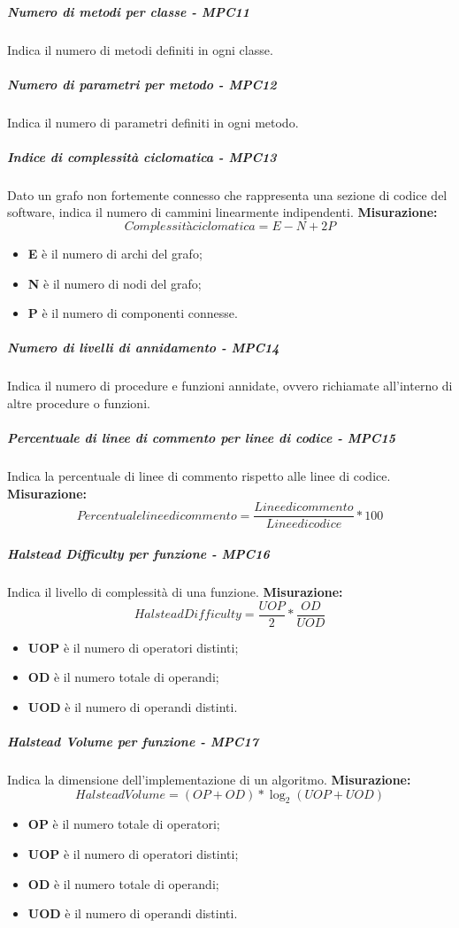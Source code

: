 \subparagraph{Numero di metodi per classe - MPC11}
Indica il numero di metodi definiti in ogni classe.
\subparagraph{Numero di parametri per metodo - MPC12}
Indica il numero di parametri definiti in ogni metodo.
\subparagraph{Indice di complessità ciclomatica - MPC13}
Dato un grafo non fortemente connesso che rappresenta una sezione di codice del software, indica il numero di cammini linearmente indipendenti.
\textbf{Misurazione:}\begin{equation}
Complessità ciclomatica = E - N + 2P
\end{equation}
\begin{itemize}
	\item \textbf{E} è il numero di archi del grafo;
	\item \textbf{N} è il numero di nodi del grafo;
	\item \textbf{P} è il numero di componenti connesse.
\end{itemize}
\subparagraph{Numero di livelli di annidamento - MPC14}
Indica il numero di procedure e funzioni annidate, ovvero richiamate all'interno di altre procedure o funzioni.
\subparagraph{Percentuale di linee di commento per linee di codice - MPC15}
Indica la percentuale di linee di commento rispetto alle linee di codice.
\textbf{Misurazione:}\begin{equation}
Percentuale linee di commento = \frac{Linee di commento}{Linee di codice} * 100
\end{equation}
\subparagraph{Halstead Difficulty per funzione - MPC16}
Indica il livello di complessità di una funzione.
\textbf{Misurazione:}\begin{equation}
Halstead Difficulty = \frac{UOP}{2} * \frac{OD}{UOD}
\end{equation}	
\begin{itemize}
	\item \textbf{UOP} è il numero di operatori distinti;
	\item \textbf{OD} è il numero totale di operandi;
	\item \textbf{UOD} è il numero di operandi distinti.
\end{itemize}
\subparagraph{Halstead Volume per funzione - MPC17}
Indica la dimensione dell'implementazione di un algoritmo.
\textbf{Misurazione:}\begin{equation}
Halstead Volume = (OP + OD) * \log_2(UOP + UOD)
\end{equation}	
\begin{itemize}
	\item \textbf{OP} è il numero totale di operatori;
	\item \textbf{UOP} è il numero di operatori distinti;
	\item \textbf{OD} è il numero totale di operandi;
	\item \textbf{UOD} è il numero di operandi distinti.
\end{itemize}
